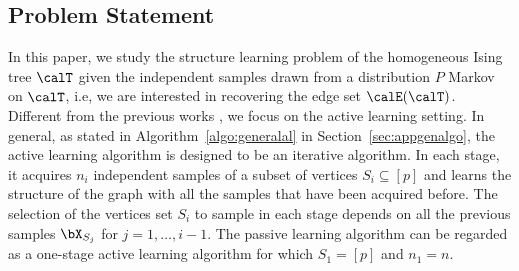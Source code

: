 \documentclass[11pt,onecolumn]{article}
\begin{document}
\subsection{Problem Statement}
In this paper, we study the structure learning problem of the homogeneous Ising tree $\calT$ given the independent samples drawn from a distribution $P$ Markov on $\calT$, i.e, we are interested in recovering the edge set $\calE(\calT)$. Different from the 
previous works \cite{chow1968approximating,tan2011large}, we focus on the active learning setting. In general, as stated in Algorithm~\ref{algo:generalal} in Section~\ref{sec:appgenalgo}, the active learning algorithm is designed to be an iterative algorithm. In each stage, it acquires $n_{i}$ independent samples of a subset 
of vertices $S_{i}\subseteq [p]$ and learns the structure of the graph with all the samples that have been acquired before. The selection of the vertices set $S_{i}$ to sample in each stage depends on all the 
previous samples $\bX_{S_{j}}$ for $j=1,\ldots,i-1$. The passive learning algorithm can be regarded as a one-stage active learning algorithm for which $S_{1}=[p]$ and $n_{1}=n$.
\end{document}
